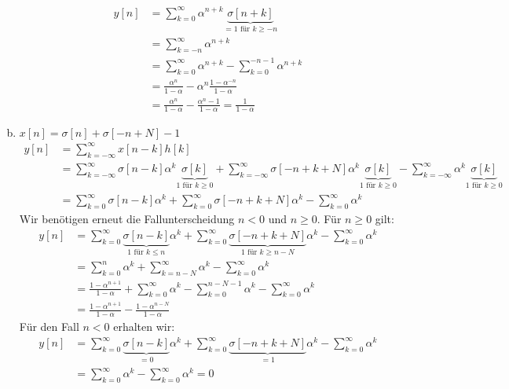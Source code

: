 \begin{enumerate}[a)]
			\begin{align*}
				y[n]	&= \sum_{k=0}^{\infty}\alpha^{n+k} \underbrace{\sigma [n+k]}_{=1 \text{ für } k \ge -n} \\
						&= \sum_{k=-n}^{\infty}\alpha^{n+k} \\
						&= \sum_{k=0}^{\infty}\alpha^{n+k} - \sum_{k=0}^{-n-1}\alpha^{n+k} \\
						&= \frac{\alpha ^n}{1-\alpha} - \alpha ^n \frac{1-\alpha ^{-n}}{1-\alpha} \\
						&= \frac{\alpha ^n}{1-\alpha} - \frac{\alpha ^n -1}{1-\alpha} = \frac{1}{1-\alpha} 
			\end{align*}
		\item $x[n]=\sigma [n]+\sigma [-n+N]-1$
			\begin{align*}
				y[n]	&= \sum_{k=-\infty}^{\infty}x[n-k]h[k] \\
						&= \sum_{k=-\infty}^{\infty}\sigma[n-k]\alpha^k \underbrace{\sigma[k]}_{1 \text{ für } k\ge 0}+ \sum_{k=-\infty}^{\infty}\sigma[-n+k+N]\alpha^k \underbrace{\sigma[k]}_{1 \text{ für } k\ge 0} - \sum_{k=-\infty}^{\infty}\alpha^k \underbrace{\sigma[k]}_{1 \text{ für } k\ge 0} \\
						&= \sum_{k=0}^{\infty}\sigma[n-k]\alpha^k + \sum_{k=0}^{\infty}\sigma[-n+k+N]\alpha^k - \sum_{k=0}^{\infty}\alpha^k
			\end{align*}
			Wir benötigen erneut die Fallunterscheidung $n<0$ und $n\ge 0$. Für $n\ge 0$ gilt:
			\begin{align*}
				y[n]	&= \sum_{k=0}^{\infty}\underbrace{\sigma[n-k]}_{1 \text{ für } k\le n}\alpha^k + \sum_{k=0}^{\infty}\underbrace{\sigma[-n+k+N]}_{1 \text{ für } k\ge n-N}\alpha^k - \sum_{k=0}^{\infty}\alpha^k \\
						&= \sum_{k=0}^{n}\alpha^k + \sum_{k=n-N}^{\infty}\alpha^k - \sum_{k=0}^{\infty}\alpha^k \\
						&= \frac{1-\alpha ^{n+1}}{1-\alpha} + \sum_{k=0}^{\infty}\alpha^k -  \sum_{k=0}^{n-N-1}\alpha^k - \sum_{k=0}^{\infty}\alpha^k \\
						&= \frac{1-\alpha ^{n+1}}{1-\alpha} - \frac{1-\alpha^{n-N}}{1-\alpha}
			\end{align*}
			Für den Fall $n<0$ erhalten wir:
			\begin{align*}
				y[n]	&= \sum_{k=0}^{\infty}\underbrace{\sigma[n-k]}_{=0}\alpha^k + \sum_{k=0}^{\infty}\underbrace{\sigma[-n+k+N]}_{=1}\alpha^k - \sum_{k=0}^{\infty}\alpha^k \\
						&= \sum_{k=0}^{\infty}\alpha^k - \sum_{k=0}^{\infty}\alpha^k = 0

\end{align*}
\end{enumerate}
